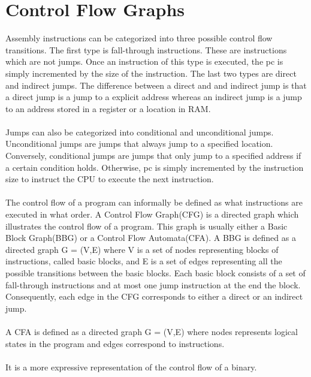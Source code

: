 \documentclass{kththesis}
\begin{document}
\section{Control Flow Graphs}%
Assembly instructions can be categorized into three possible control flow transitions. The first type is fall-through instructions. These are instructions which are not jumps. Once an instruction of this type is executed, the pc is simply incremented by the size of the instruction. The last two types are direct and indirect jumps. The difference between a direct and and indirect jump is that a direct jump is a jump to a explicit address whereas an indirect jump is a jump to an address stored in a register or a location in RAM. 
\\ \\
Jumps can also be categorized into conditional and unconditional jumps. Unconditional jumps are jumps that always jump to a specified location. Conversely, conditional jumps are jumps that only jump to a specified address if a certain condition holds. Otherwise, pc is simply incremented by the instruction size to instruct the CPU to execute the next instruction.
\\ \\
The control flow of a program can informally be defined as what instructions are executed in what order. A Control Flow Graph(CFG) is a directed graph which illustrates the control flow of a program. This graph is usually either a Basic Block Graph(BBG) or a Control Flow Automata(CFA). A BBG is defined as a directed graph G = (V,E) where V is a set of nodes representing blocks of instructions, called basic blocks, and E is a set of edges representing all the possible transitions between the basic blocks. Each basic block consists of a set of fall-through instructions and at most one jump instruction at the end the block. Consequently, each edge in the CFG corresponds to either a direct or an indirect jump.
\\ \\ 
A CFA is defined as a directed graph G = (V,E) where nodes represents logical states in the program and edges correspond to instructions. 
\\ \\
It is a more expressive representation of the control flow of a binary. 
\end{document}
